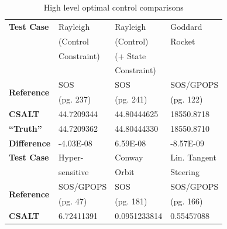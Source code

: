 \documentclass[ISTS  ]{tjsass} %
\newcommand{\bhline}[1]{\noalign{\hrule height #1}}
\begin{document}
\begin{table}
	\centering
	\caption{High level optimal control comparisons}
	\label{table:high_level_comparison}
	\begin{tabularx}{\columnwidth}{lXXX}\bhline{.8pt}
                         \textbf{Test Case}  & Rayleigh    & Rayleigh                              & Goddard                 \\
                                             & (Control    & (Control)                             & Rocket                  \\
                                             & Constraint) & (+ State                              &                         \\
                                             &             & Constraint)                           &                         \\\hline
        \multirow{2}{*}{\textbf{Reference}} & SOS                          & SOS                                   & SOS/GPOPS               \\
                            & (pg. 237)                    & (pg. 241)                             & (pg. 122)               \\
        \textbf{CSALT}      & 44.7209344                   & 44.80444625                           & 18550.8718              \\
        \textbf{``Truth''}  & 44.7209362                   & 44.80444330                           & 18550.8710              \\
        \textbf{Difference} & -4.03E-08                    & 6.59E-08                              & -8.57E-09               \\\bhline{.8pt}
        \textbf{Test Case}  & Hyper-                       & Conway                                & Lin. Tangent            \\
                            & sensitive                    & Orbit                                 & Steering                \\\hline
        \multirow{2}{*}{\textbf{Reference}} & SOS/GPOPS                    & SOS                                   & SOS/GPOPS               \\
                            & (pg. 47)                     & (pg. 181)                             & (pg. 166)               \\
        \textbf{CSALT}      & 6.72411391                   & 0.0951233814                          & 0.55457088              \\

\end{tabularx}
\end{table}
\end{document}
